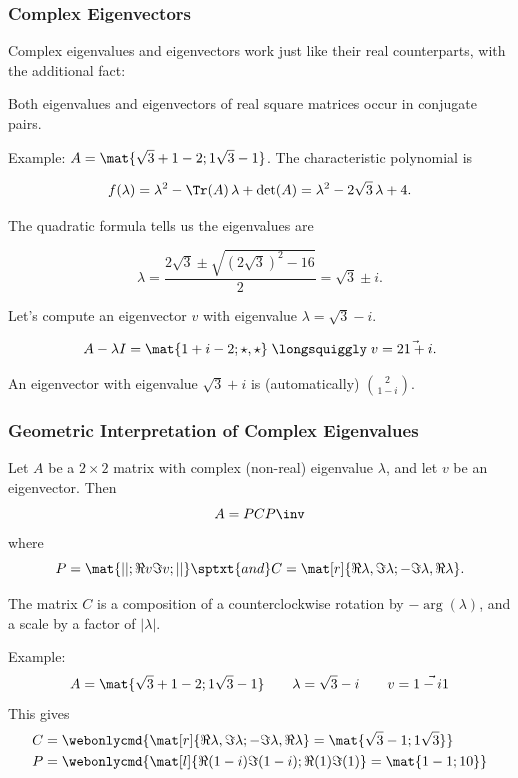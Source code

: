 
\begin{frame}
\frametitle{Complex Eigenvectors}

Complex eigenvalues and eigenvectors work just like their real counterparts,
with the additional fact:
\pause\smallskip
\begin{bluebox}{.6\linewidth}
  Both eigenvalues and eigenvectors of real square matrices occur in conjugate pairs.
\end{bluebox}

\pause\medskip\displayskips{3pt}%
\alert{Example:} $A = \mat{\sqrt 3+1 -2; 1 \sqrt 3-1}$.
\pause
The characteristic polynomial is
\begin{webonly}
\[ f(\lambda) = \lambda^2 - \Tr(A)\,\lambda + \det(A)
  = \lambda^2 - 2\sqrt 3\,\lambda + 4.
\]
\end{webonly}
The quadratic formula tells us the eigenvalues are
\begin{webonly}
\[ \lambda = \frac{2\sqrt 3\pm\sqrt{(2\sqrt 3)^2-16}}2
= \sqrt 3\pm i. \]
\end{webonly}
Let's compute an eigenvector $v$ with eigenvalue $\lambda=\sqrt 3-i$.
\begin{webonly}
\[ A-\lambda I = \mat{1+i -2; \star, \star} 
\;\longsquiggly\; v = \vec{2 1+i}. \]
\end{webonly}%
\pause
An eigenvector with eigenvalue $\sqrt 3 + i$ is (automatically)
\pause
${2\choose 1-i}$.

\end{frame}



\begin{frame}
\frametitle{Geometric Interpretation of Complex Eigenvalues}

\vskip-3mm
\begin{thm}
  Let $A$ be a $2\times 2$ matrix with complex (non-real) eigenvalue $\lambda$,
  and let $v$ be an eigenvector.  Then
  \[ A = PCP\inv \]
  where
  \[ P = \mat{| |; \Re v \Im v; | |}
  \sptxt{and}
  C = \mat[r]{\Re\lambda, \Im\lambda; -\Im\lambda, \Re\lambda}. \]

  \smallskip
  The matrix $C$ is a composition of a counterclockwise rotation by 
  $-\arg(\lambda)$, and a scale by a factor of $|\lambda|$.
\end{thm}

\pause\smallskip
\alert{Example:}\vskip-2mm
\displayskips{2pt}
\[ A = \mat{\sqrt 3+1 -2; 1 \sqrt 3-1} 
\qquad
\lambda = \sqrt 3-i
\qquad
v = \vec{1-i 1}
\]
\pause
This gives
\[\begin{split}
  C &= \webonlycmd{\mat[r]{\Re\lambda, \Im\lambda; -\Im\lambda, \Re\lambda}
  = \mat{\sqrt 3 -1; 1 \sqrt 3}} \\
  P &= \webonlycmd{\mat[l]{\Re(1-i) \Im(1-i); \Re(1) \Im(1)} = \mat{1 -1; 1 0}} 
\end{split}\]

\end{frame}


